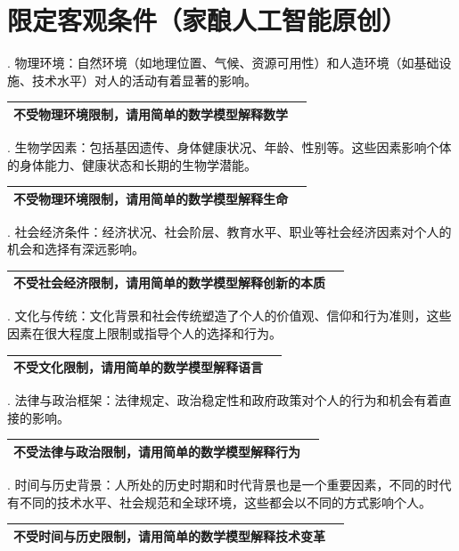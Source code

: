 \documentclass[12pt]{book}
\begin{document}
\section{限定客观条件（家酿人工智能原创）}

. 物理环境：自然环境（如地理位置、气候、资源可用性）和人造环境（如基础设施、技术水平）对人的活动有着显著的影响。

\begin{tabular}{|p{15cm}|p{3cm}|}
	\hline
不受物理环境限制，请用简单的数学模型解释数学\\
	\hline
\end{tabular}


. 生物学因素：包括基因遗传、身体健康状况、年龄、性别等。这些因素影响个体的身体能力、健康状态和长期的生物学潜能。

\begin{tabular}{|p{15cm}|p{3cm}|}
	\hline
不受物理环境限制，请用简单的数学模型解释生命\\
	\hline
\end{tabular}


. 社会经济条件：经济状况、社会阶层、教育水平、职业等社会经济因素对个人的机会和选择有深远影响。

\begin{tabular}{|p{15cm}|p{3cm}|}
	\hline
不受社会经济限制，请用简单的数学模型解释创新的本质\\
	\hline
\end{tabular}


. 文化与传统：文化背景和社会传统塑造了个人的价值观、信仰和行为准则，这些因素在很大程度上限制或指导个人的选择和行为。

\begin{tabular}{|p{15cm}|p{3cm}|}
	\hline
不受文化限制，请用简单的数学模型解释语言\\
	\hline
\end{tabular}


. 法律与政治框架：法律规定、政治稳定性和政府政策对个人的行为和机会有着直接的影响。

\begin{tabular}{|p{15cm}|p{3cm}|}
	\hline
不受法律与政治限制，请用简单的数学模型解释行为\\
	\hline
\end{tabular}


. 时间与历史背景：人所处的历史时期和时代背景也是一个重要因素，不同的时代有不同的技术水平、社会规范和全球环境，这些都会以不同的方式影响个人。

\begin{tabular}{|p{15cm}|p{3cm}|}
	\hline
不受时间与历史限制，请用简单的数学模型解释技术变革\\
	\hline
\end{tabular}
\end{document}
